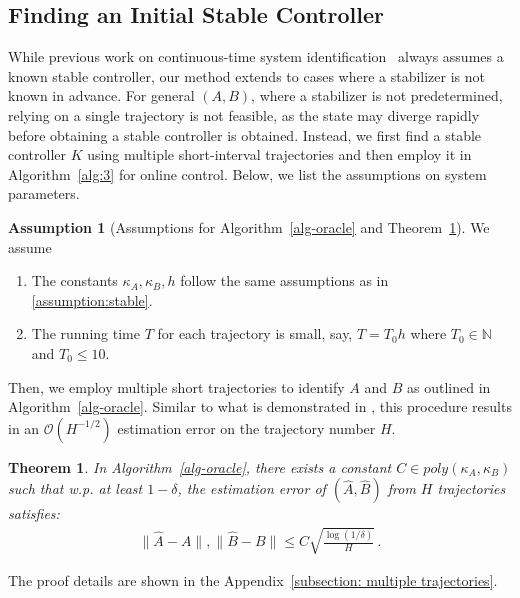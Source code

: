 \documentclass{article}
\newtheorem{theorem}{Theorem}
\theoremstyle{definition}
\newtheorem{assumption}{Assumption}
\begin{document}
\subsection{Finding an Initial Stable Controller}

While previous work on continuous-time system identification~\cite{ref3, ref1} always assumes a known stable controller, our method extends to cases where a stabilizer is not known in advance. 
For general $(A,B)$, where a stabilizer is not predetermined, relying on a single trajectory is not feasible, as the state may diverge rapidly before obtaining a stable controller is obtained. Instead, we first find a stable controller $K$ using multiple short-interval trajectories and then employ it in Algorithm~\ref{alg:3} for online control. Below, we list the assumptions on system parameters.

\begin{assumption}[Assumptions for Algorithm~\ref{alg-oracle} and Theorem~\ref{thm:main-unstable}]\label{assumption:multiple} We assume
    \begin{enumerate}
        \item The constants $\kappa_{A},\kappa_{B},h$ follow the same assumptions as in \ref{assumption:stable}.
        \item The running time $T$ for each trajectory is small, say, $T=T_{0}h$ where $T_{0}\in\mathbb{N}$ and $T_{0}\leq 10$.
    \end{enumerate}
\end{assumption}
Then, we employ multiple short trajectories to identify $A$ and $B$ as outlined in Algorithm~\ref{alg-oracle}. Similar to what is demonstrated in \cite{ref5}, this procedure results in an $\mathcal{O}(H^{-1/2})$ estimation error on the trajectory number $H$.
\begin{theorem}\label{thm:main-unstable}
In Algorithm~\ref{alg-oracle}, there exists a constant $C\in poly(\kappa_{A},\kappa_{B})$ such that w.p. at least $1-\delta$, the estimation error of $(\hat{A},\hat{B})$ from $H$ trajectories satisfies:
	\begin{align*}
	\|\hat{A}-A\|,\|\hat{B}-B\|\leq C\sqrt{\frac{\log(1/\delta)}{H}}\,.
	\end{align*}

\end{theorem}
The proof details are shown in the Appendix~\ref{subsection: multiple trajectories}.
\end{document}
